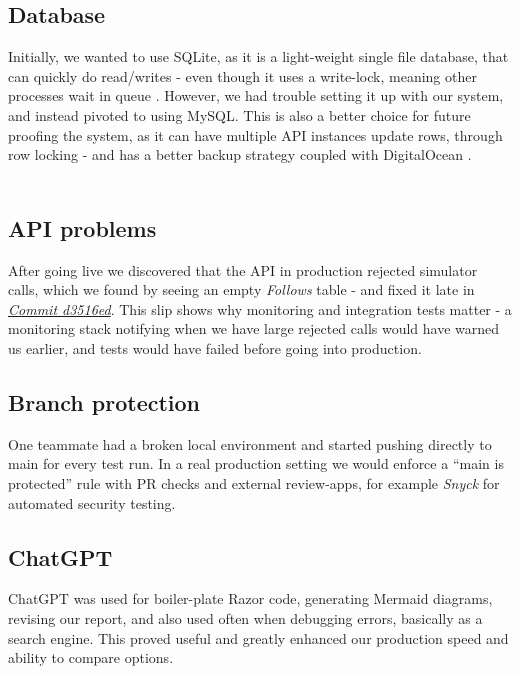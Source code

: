 \subsection{Database}
Initially, we wanted to use SQLite, as it is a light-weight single file database, that can quickly do read/writes - even though it uses a write-lock, meaning other processes wait in queue \cite{sqlite}. However, we had trouble setting it up with our system, and instead pivoted to using MySQL. This is also a better choice for future proofing the system, as it can have multiple API instances update rows, through row locking - and has a better backup strategy coupled with DigitalOcean \cite{mysql}.
\\\\
\subsection{API problems}
After going live we discovered that the API in production rejected simulator calls, which we found by seeing an empty \textit{Follows} table - and fixed it late in \textit{\href{https://github.com/Lukski175/MiniTwit-FS/commit/d3516edf5bb13276301662131f545ecd64904e19}{Commit d3516ed}}. This slip shows why monitoring and integration tests matter - a monitoring stack notifying when we have large rejected calls would have warned us earlier, and tests would have failed before going into production.
\\
\subsection{Branch protection}
One teammate had a broken local environment and started pushing directly to main for every test run. In a real production setting we would enforce a “main is protected” rule with PR checks and external review-apps, for example \textit{Snyck} for automated security testing.

\subsection{ChatGPT}
ChatGPT was used for boiler-plate Razor code, generating Mermaid diagrams, revising our report, and also used often when debugging errors, basically as a search engine. This proved useful and greatly enhanced our production speed and ability to compare options.

